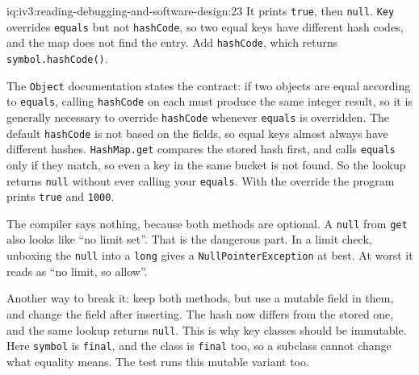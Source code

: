 \begin{solution}{iq:iv3:reading-debugging-and-software-design:23}
It prints \texttt{true}, then \texttt{null}. \texttt{Key} overrides \texttt{equals} but not \texttt{hashCode}, so two equal keys have different hash codes, and the map does not find the entry. Add \texttt{hashCode}, which returns \texttt{symbol.hashCode()}.

The \texttt{Object} documentation states the contract: if two objects are equal according to \texttt{equals}, calling \texttt{hashCode} on each must produce the same integer result, so it is generally necessary to override \texttt{hashCode} whenever \texttt{equals} is overridden. The default \texttt{hashCode} is not based on the fields, so equal keys almost always have different hashes. \texttt{HashMap.get} compares the stored hash first, and calls \texttt{equals} only if they match, so even a key in the same bucket is not found. So the lookup returns \texttt{null} without ever calling your \texttt{equals}. With the override the program prints \texttt{true} and \texttt{1000}.

The compiler says nothing, because both methods are optional. A \texttt{null} from \texttt{get} also looks like ``no limit set''. That is the dangerous part. In a limit check, unboxing the \texttt{null} into a \texttt{long} gives a \texttt{NullPointerException} at best. At worst it reads as ``no limit, so allow''.

Another way to break it: keep both methods, but use a mutable field in them, and change the field after inserting. The hash now differs from the stored one, and the same lookup returns \texttt{null}. This is why key classes should be immutable. Here \texttt{symbol} is \texttt{final}, and the class is \texttt{final} too, so a subclass cannot change what equality means. The test runs this mutable variant too.


\end{solution}

